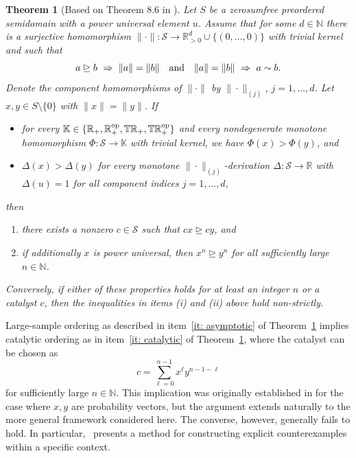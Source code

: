 \documentclass[aps,pra,11pt,onecolumn,nofootinbib,tightenlines]{revtex4-2}
\newtheorem{theorem}{Theorem}[section]
\theoremstyle{definition}
\newcommand{\cS}{\mathcal{S}}
\newcommand{\R}{\mathbb{R}}
\newcommand{\T}{\mathbb{T}}
\newcommand{\mb}[1]{\mathbb{#1}}
\newcommand{\rgeq}{\trianglerighteq}
\begin{document}
\begin{theorem}[Based on Theorem 8.6 in \cite{fritz2023abstractII}]\label{thm:Fritz2022}
Let $S$ be a zerosumfree preordered semidomain with a power universal element $u$. Assume that for some $d\in\mb N$ there is a surjective homomorphism $\|\cdot\|:\cS\to\R_{>0}^d\cup\{(0,\ldots,0)\}$ with trivial kernel and such that
\begin{equation}\label{eq:surjectivehomomorphismproperties}
a\rgeq b\ \Rightarrow\ \|a\|=\|b\|\quad {\rm and} \quad \|a\|=\|b\|\ \Rightarrow\ a\sim b.
\end{equation}
Denote the component homomorphisms of $\|\cdot\|$ by $\|\cdot\|_{(j)}$, $j=1,\ldots,d$. Let $x,y\in S\setminus\{0\}$ with $\|x\|=\|y\|$. If
\begin{itemize}
\item[(i)] for every $\mb K\in\{\R_+,\R_+^{\rm op},\T\R_+,\T\R_+^{\rm op}\}$ and every nondegenerate monotone homomorphism $\Phi : \cS \to \mb K$ with trivial kernel, we have $\Phi(x) > \Phi(y)$, and
\item[(ii)] $\Delta(x) > \Delta(y)$ for every monotone $\|\cdot\|_{(j)}$-derivation $\Delta : \cS \to \R$ with $\Delta(u) = 1$ for all component indices $j = 1,\ldots,d$,
\end{itemize}
then
\begin{enumerate}[label=(\alph*),ref=2(\alph*)]
 \item there exists a nonzero $c\in \cS$ such that $cx\rgeq cy$, and
\label{it: catalytic}
\item if additionally $x$ is power universal, then $x^n \rgeq y^n$ for all sufficiently large $n\in\mb N$.
\label{it: asymptotic}
\end{enumerate}
Conversely, if either of these properties holds for at least an integer $n$ or a catalyst $c$, then the inequalities in items (i) and (ii) above hold non-strictly.
\end{theorem}
Large-sample ordering as described in item~\ref{it: asymptotic} of Theorem~\ref{thm:Fritz2022} implies catalytic ordering as in item~\ref{it: catalytic} of Theorem~\ref{thm:Fritz2022}, where the catalyst can be chosen as
\begin{equation}
    c = \sum_{\ell=0}^{n-1} x^\ell y^{n-1-\ell}
\end{equation}
for sufficiently large $n \in \mathbb{N}$. This implication was originally established in \cite{duan2005multiple} for the case where $x, y$ are probability vectors, but the argument extends naturally to the more general framework considered here.
The converse, however, generally fails to hold. In particular,~\cite[Theorem 3]{feng2006relation} presents a method for constructing explicit counterexamples within a specific context.
\end{document}
